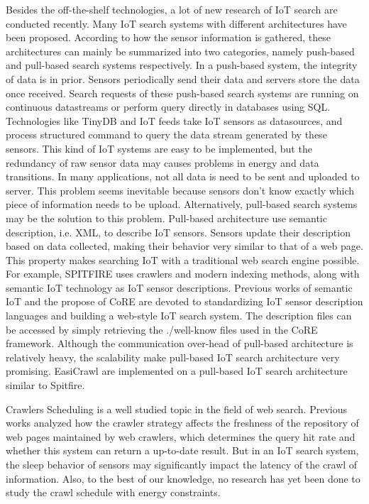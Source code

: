 \documentclass[conference]{IEEEtran}
\begin{document}
Besides the off-the-shelf technologies, a lot of new research of IoT search are conducted recently. 
Many IoT search systems with different architectures have been proposed.
According to how the sensor information is gathered, these architectures can mainly be summarized into two categories, namely push-based and pull-based search systems respectively.
In a push-based system, the integrity of data is in prior.
Sensors periodically send their data and servers store the data once received. 
Search requests of these push-based search systems are running on continuous datastreams or perform query directly in databases using SQL. 
Technologies like TinyDB\cite{TinyDB} and IoT feeds\cite{Whitehouse2006} take IoT sensors as datasources, and process structured command to query the data stream generated by these sensors. 
This kind of IoT systems are easy to be implemented, but the redundancy of raw sensor data may causes problems in energy and data transitions.
In many applications, not all data is need to be sent and uploaded to server. 
This problem seems inevitable because sensors don't know exactly which piece of information needs to be upload.
Alternatively, pull-based search systems may be the solution to this problem.
Pull-based architecture use semantic description, i.e. XML, to describe IoT sensors. 
Sensors update their description based on data collected, making their behavior very similar to that of a web page.
This property makes searching IoT with a traditional web search engine possible. 
For example, SPITFIRE\cite{SPITFIRE} uses crawlers and modern indexing methods, along with semantic IoT technology as IoT sensor descriptions. 
Previous works of semantic IoT\cite{Compton2012} and the propose of CoRE\cite{CoREWorkingGroup2012} are devoted to standardizing IoT sensor description languages and building a web-style IoT search system. 
The description files can be accessed by simply retrieving the ./well-know files used in the CoRE framework. 
Although the communication over-head of pull-based architecture is relatively heavy, the scalability make pull-based IoT search architecture very promising.
EasiCrawl are implemented on a pull-based IoT search architecture similar to Spitfire.

Crawlers Scheduling is a well studied topic in the field of web search. 
Previous works\cite{Cho2000}\cite{Wolf2002}\cite{Challenger2004} analyzed how the crawler strategy affects the freshness of the repository of web pages maintained by web crawlers, which determines the query hit rate and whether this system can return a up-to-date result. 
But in an IoT search system, the sleep behavior of sensors may significantly impact the latency of the crawl of information.
Also, to the best of our knowledge, no research has yet been done to study the crawl schedule with energy constraints.
\end{document}
